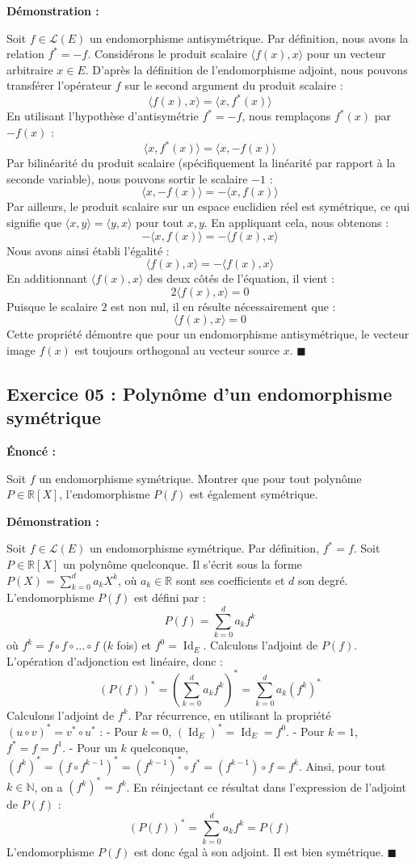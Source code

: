 \documentclass[11pt,a4paper]{article}
\begin{document}
\textbf{Démonstration :}


Soit $f \in \mathcal{L}(E)$ un endomorphisme antisymétrique. Par définition, nous avons la relation $f^* = -f$.
Considérons le produit scalaire $\langle f(x), x \rangle$ pour un vecteur arbitraire $x \in E$.
D'après la définition de l'endomorphisme adjoint, nous pouvons transférer l'opérateur $f$ sur le second argument du produit scalaire :
$$ \langle f(x), x \rangle = \langle x, f^*(x) \rangle $$
En utilisant l'hypothèse d'antisymétrie $f^* = -f$, nous remplaçons $f^*(x)$ par $-f(x)$ :
$$ \langle x, f^*(x) \rangle = \langle x, -f(x) \rangle $$
Par bilinéarité du produit scalaire (spécifiquement la linéarité par rapport à la seconde variable), nous pouvons sortir le scalaire $-1$ :
$$ \langle x, -f(x) \rangle = -\langle x, f(x) \rangle $$
Par ailleurs, le produit scalaire sur un espace euclidien réel est symétrique, ce qui signifie que $\langle x, y \rangle = \langle y, x \rangle$ pour tout $x, y$. En appliquant cela, nous obtenons :
$$ -\langle x, f(x) \rangle = -\langle f(x), x \rangle $$
Nous avons ainsi établi l'égalité :
$$ \langle f(x), x \rangle = -\langle f(x), x \rangle $$
En additionnant $\langle f(x), x \rangle$ des deux côtés de l'équation, il vient :
$$ 2\langle f(x), x \rangle = 0 $$
Puisque le scalaire $2$ est non nul, il en résulte nécessairement que :
$$ \langle f(x), x \rangle = 0 $$
Cette propriété démontre que pour un endomorphisme antisymétrique, le vecteur image $f(x)$ est toujours orthogonal au vecteur source $x$. $\blacksquare$

\subsection*{Exercice 05 : Polynôme d'un endomorphisme symétrique}


\textbf{Énoncé :}


Soit $f$ un endomorphisme symétrique. Montrer que pour tout polynôme $P \in \mathbb{R}[X]$, l'endomorphisme $P(f)$ est également symétrique.

\textbf{Démonstration :}


Soit $f \in \mathcal{L}(E)$ un endomorphisme symétrique. Par définition, $f^* = f$.
Soit $P \in \mathbb{R}[X]$ un polynôme quelconque. Il s'écrit sous la forme $P(X) = \sum_{k=0}^d a_k X^k$, où $a_k \in \mathbb{R}$ sont ses coefficients et $d$ son degré.
L'endomorphisme $P(f)$ est défini par :
$$ P(f) = \sum_{k=0}^d a_k f^k $$
où $f^k = f \circ f \circ \dots \circ f$ ($k$ fois) et $f^0 = \operatorname{Id}_E$.
Calculons l'adjoint de $P(f)$. L'opération d'adjonction est linéaire, donc :
$$ (P(f))^* = \left( \sum_{k=0}^d a_k f^k \right)^* = \sum_{k=0}^d a_k (f^k)^* $$
Calculons l'adjoint de $f^k$. Par récurrence, en utilisant la propriété $(u \circ v)^* = v^* \circ u^*$ :
- Pour $k=0$, $(\operatorname{Id}_E)^* = \operatorname{Id}_E = f^0$.
- Pour $k=1$, $f^* = f = f^1$.
- Pour un $k$ quelconque, $(f^k)^* = (f \circ f^{k-1})^* = (f^{k-1})^* \circ f^* = (f^{k-1}) \circ f = f^k$.
Ainsi, pour tout $k \in \mathbb{N}$, on a $(f^k)^* = f^k$.
En réinjectant ce résultat dans l'expression de l'adjoint de $P(f)$ :
$$ (P(f))^* = \sum_{k=0}^d a_k f^k = P(f) $$
L'endomorphisme $P(f)$ est donc égal à son adjoint. Il est bien symétrique. $\blacksquare$
\end{document}
